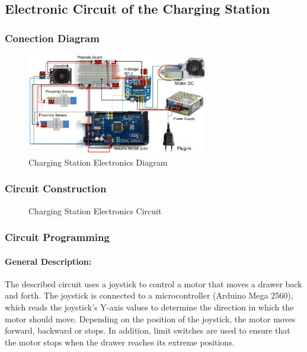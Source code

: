 
\subsection{Electronic Circuit of the Charging Station}

    \subsubsection{Conection Diagram}
    
    \begin{figure}[H]
        \centering
        \includegraphics[width=0.7\textwidth]{pictures/circuito charging st (1).png}
        \caption{Charging Station Electronics Diagram}
        \label{fig:station_electronics_diagram}
    \end{figure}
    
    \subsubsection{Circuit Construction}
    \begin{figure}[H]
        \centering
        \caption{Charging Station Electronics Circuit}
        \label{fig:station_electronics_circuit}
    \end{figure}
    
    \subsubsection{Circuit Programming}
    
    \paragraph{\textbf{General Description:}}
    
    
    The described circuit uses a joystick to control a motor that moves a drawer back and forth. The joystick is connected to a microcontroller (Arduino Mega 2560), which reads the joystick's Y-axis values to determine the direction in which the motor should move. Depending on the position of the joystick, the motor moves forward, backward or stops. In addition, limit switches are used to ensure that the motor stops when the drawer reaches its extreme positions.
    
